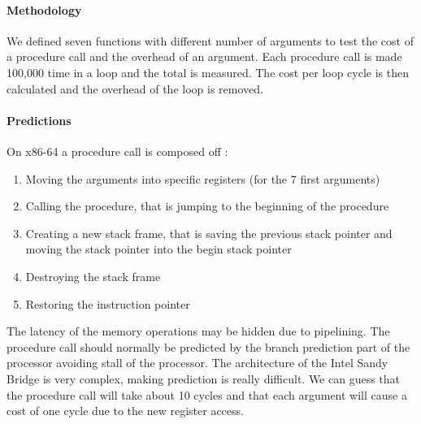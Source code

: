 \paragraph{Methodology}
We defined seven functions with different number of arguments to test the
cost of a procedure call and the overhead of an argument.
Each procedure call is made 100,000 time in a loop and the total is measured.
The cost per loop cycle is then calculated and the overhead of the loop is
removed.

\paragraph{Predictions}
On x86-64 a procedure call is composed off :
\begin{enumerate}
\item Moving the arguments into specific registers (for the 7 first arguments)
\item Calling the procedure, that is jumping to the beginning of the procedure
\item Creating a new stack frame, that is saving the previous stack pointer and
moving the stack pointer into the begin stack pointer
\item Destroying the stack frame
\item Restoring the instruction pointer
\end{enumerate}

The latency of the memory operations may be hidden due to pipelining.
The procedure call should normally be predicted by the branch prediction part of
the processor avoiding stall of the processor.
The architecture of the Intel Sandy Bridge is very complex, making prediction is
really difficult.
We can guess that the procedure call will take about 10 cycles and that each
argument will cause a cost of one cycle due to the new register access.


